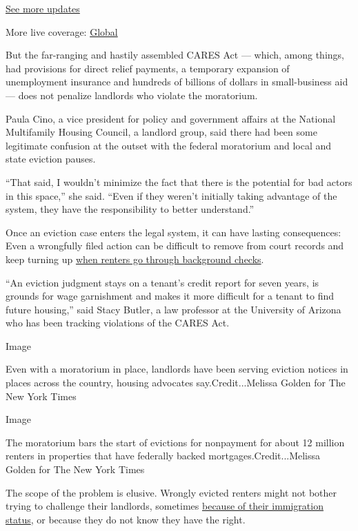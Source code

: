 \href{https://www.nytimes.com/live/2020/08/03/business/stock-market-today-coronavirus?action=click\&pgtype=Article\&state=default\&region=MAIN_CONTENT_1\&context=storylines_live_updates}{See
more updates}

More live coverage:
\href{https://www.nytimes.com/2020/08/04/world/coronavirus-covid-19.html?action=click\&pgtype=Article\&state=default\&region=MAIN_CONTENT_1\&context=storylines_live_updates}{Global}

But the far-ranging and hastily assembled CARES Act --- which, among
things, had provisions for direct relief payments, a temporary expansion
of unemployment insurance and hundreds of billions of dollars in
small-business aid --- does not penalize landlords who violate the
moratorium.

Paula Cino, a vice president for policy and government affairs at the
National Multifamily Housing Council, a landlord group, said there had
been some legitimate confusion at the outset with the federal moratorium
and local and state eviction pauses.

``That said, I wouldn't minimize the fact that there is the potential
for bad actors in this space,'' she said. ``Even if they weren't
initially taking advantage of the system, they have the responsibility
to better understand.''

Once an eviction case enters the legal system, it can have lasting
consequences: Even a wrongfully filed action can be difficult to remove
from court records and keep turning up
\href{https://www.nytimes.com/2020/05/28/business/renters-background-checks.html}{when
renters go through background checks}.

``An eviction judgment stays on a tenant's credit report for seven
years, is grounds for wage garnishment and makes it more difficult for a
tenant to find future housing,'' said Stacy Butler, a law professor at
the University of Arizona who has been tracking violations of the CARES
Act.

Image

Even with a moratorium in place, landlords have been serving eviction
notices in places across the country, housing advocates
say.Credit...Melissa Golden for The New York Times

Image

The moratorium bars the start of evictions for nonpayment for about 12
million renters in properties that have federally backed
mortgages.Credit...Melissa Golden for The New York Times

The scope of the problem is elusive. Wrongly evicted renters might not
bother trying to challenge their landlords, sometimes
\href{https://www.nytimes.com/2020/07/04/us/coronavirus-evictions-renters-immigrants.html}{because
of their immigration status}, or because they do not know they have the
right.

